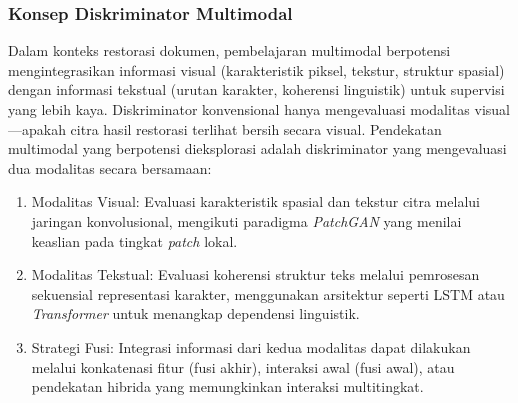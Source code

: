 \documentclass[12pt,a4paper]{article}
\begin{document}
\subsubsection{Konsep Diskriminator Multimodal}
\label{subsubsec:konsep-diskriminator-multimodal}

Dalam konteks restorasi dokumen, pembelajaran multimodal berpotensi mengintegrasikan informasi visual (karakteristik piksel, tekstur, struktur spasial) dengan informasi tekstual (urutan karakter, koherensi linguistik) untuk supervisi yang lebih kaya. Diskriminator konvensional hanya mengevaluasi modalitas visual—apakah citra hasil restorasi terlihat bersih secara visual. Pendekatan multimodal yang berpotensi dieksplorasi adalah diskriminator yang mengevaluasi dua modalitas secara bersamaan:

\begin{enumerate}[leftmargin=1.5em, labelsep=0.5em, itemindent=0pt, label=\alph*., topsep=0pt, parsep=0pt, itemsep=0pt]
      \item Modalitas Visual: \mbox{} Evaluasi karakteristik spasial dan tekstur citra melalui jaringan konvolusional, mengikuti paradigma \textit{PatchGAN} \parencite{isola2017} yang menilai keaslian pada tingkat \textit{patch} lokal.

      \item Modalitas Tekstual: \mbox{} Evaluasi koherensi struktur teks melalui pemrosesan sekuensial representasi karakter, menggunakan arsitektur seperti LSTM atau \textit{Transformer} untuk menangkap dependensi linguistik.

      \item Strategi Fusi: \mbox{} Integrasi informasi dari kedua modalitas dapat dilakukan melalui konkatenasi fitur (fusi akhir), interaksi awal (fusi awal), atau pendekatan hibrida yang memungkinkan interaksi multitingkat.
\end{enumerate}
\end{document}
